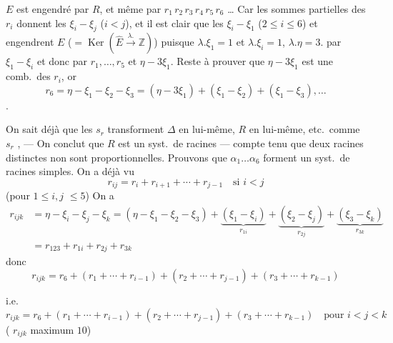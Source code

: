 \documentclass[11pt,a4paper]{article}
\begin{document}
$E$ est engendré par $R$, et même par $r_1\, r_2\, r_3\, r_4\, r_5\, r_6$
… Car les sommes partielles des $r_i$ donnent
les $\xi_i - \xi_j$ ($i < j$), et il est clair que les $\xi_i - \xi_1$ ($2
\leq i \leq 6$) et \struck{$\eta - 2\lambda$} 
engendrent $E$ ($= \operatorname{Ker}(\widehat{E} \xrightarrow{\lambda.}
\mathbb{Z})$) puisque $\lambda . \xi_1 = 1$ et $\lambda . \xi_i = 1$,
$\lambda . \eta = 3$. 
 par  $\xi_1 - \xi_i$ et 
\struck{$3\lambda - \eta$} donc par $r_1, \dots, r_5$ et $\eta - 3\xi_1$.
Reste à prouver que $\eta - 3\xi_1$ est une comb.\ des $r_i$, or
\[
r_6 = \eta - \xi_1 - \xi_2 - \xi_3
= (\eta - 3\xi_1) + (\xi_1 - \xi_2) + (\xi_1 - \xi_3), \ldots
\]
.

On sait déjà que les $s_r$ transforment $\Delta$ en lui-même, $R$ en
lui-même, etc.\ comme $s_r$ , \struck{\ill{}} — On conclut que $R$ est un syst.\ de racines —
compte tenu que deux racines distinctes non \ill{} sont 
proportionnelles. Prouvons que \struck{\ill{}} $\alpha_1 \dots \alpha_6$
forment un syst.\ de racines simples. \struck{\ill{} \ill{}} On a déjà vu
\[
\boxed{r_{ij} = r_i + r_{i+1} + \cdots + r_{j-1} \quad \text{si } i < j}
\]
(pour $1 \leq i, j$  $\leq 5$)
On a
\[
\begin{aligned}
r_{ijk} &= \eta - \xi_i - \xi_j - \xi_k = (\eta - \xi_1 - \xi_2 - \xi_3)
+ \underbrace{(\xi_1 - \xi_i)}_{r_{1i}} + \underbrace{(\xi_2 - \xi_j)}_{r_{2j}} + \underbrace{(\xi_3 - \xi_k)}_{r_{3k}} \\
&= r_{123} + r_{1i} + r_{2j} + r_{3k}
\end{aligned}
\]
donc
\[
r_{ijk} = r_6 + (r_1 + \cdots + r_{i-1}) + (r_2 + \cdots + r_{j-1}) + (r_3 + \cdots + r_{k-1})
\]

i.e.
\[
\boxed{r_{ijk} = r_6 + (r_1 + \cdots + r_{i-1}) + (r_2 + \cdots + r_{j-1}) + (r_3 + \cdots + r_{k-1})}
\quad \text{pour } i < j < k
\]
( $r_{ijk}$ maximum $10$)
\end{document}
